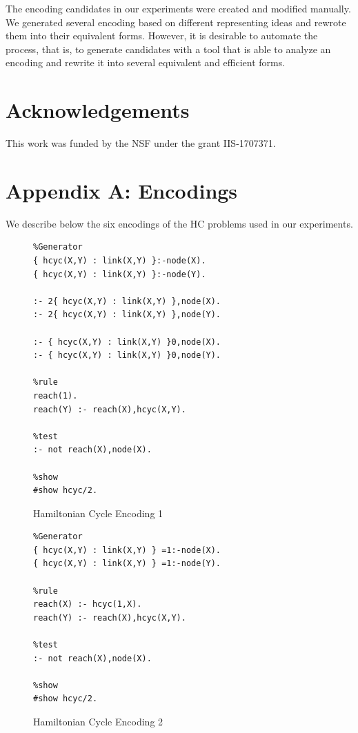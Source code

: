 \documentclass{new_tlp}
\begin{document}
The encoding candidates in our experiments were created and modified manually. 
We generated several encoding based on different representing ideas and rewrote 
them into their equivalent forms. However, it is desirable to automate the 
process, that is, to generate candidates with a tool that is able to analyze 
an encoding and rewrite it into several equivalent and efficient forms. 

\section*{Acknowledgements}
This work was funded by the NSF under the grant IIS-1707371.



\newpage
\section*{Appendix A: Encodings}
We describe below the six encodings of the HC problems used in our 
experiments. %

\begin{figure}[!h]
\figrule
\begin{center}
\begin{verbatim}
%Generator
{ hcyc(X,Y) : link(X,Y) }:-node(X).
{ hcyc(X,Y) : link(X,Y) }:-node(Y).

:- 2{ hcyc(X,Y) : link(X,Y) },node(X).
:- 2{ hcyc(X,Y) : link(X,Y) },node(Y).

:- { hcyc(X,Y) : link(X,Y) }0,node(X).
:- { hcyc(X,Y) : link(X,Y) }0,node(Y).

%rule
reach(1).
reach(Y) :- reach(X),hcyc(X,Y).

%test
:- not reach(X),node(X).

%show
#show hcyc/2.
\end{verbatim}
\end{center}
\figrule
\caption{Hamiltonian Cycle Encoding 1}\label{enc1}
\end{figure}
\begin{figure}[!h]
\figrule
\begin{center}
\begin{verbatim}
%Generator
{ hcyc(X,Y) : link(X,Y) } =1:-node(X).
{ hcyc(X,Y) : link(X,Y) } =1:-node(Y).

%rule
reach(X) :- hcyc(1,X).
reach(Y) :- reach(X),hcyc(X,Y).

%test
:- not reach(X),node(X).

%show
#show hcyc/2.
\end{verbatim}
\end{center}
\figrule
\caption{Hamiltonian Cycle Encoding 2}\label{enc2}
\end{figure}
\end{document}
